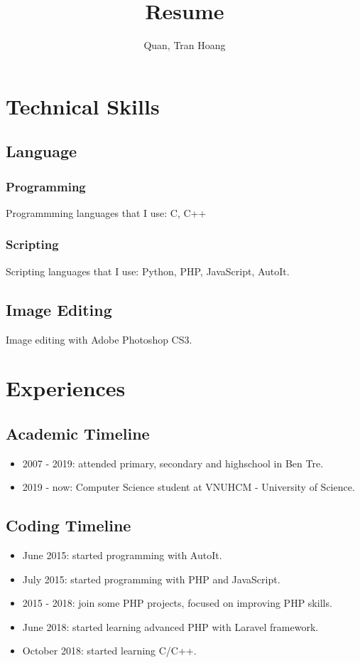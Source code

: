 \documentclass{article}
\begin{document}
    \title{Resume}
    \author{Quan, Tran Hoang}
    \maketitle

    \section{Technical Skills}

        \subsection{Language}
            \subsubsection{Programming}
                Programmming languages that I use: C, C++
            \subsubsection{Scripting}
                Scripting languages that I use: Python, PHP, JavaScript, AutoIt.

        \subsection{Image Editing}
            Image editing with Adobe Photoshop CS3.

    \section{Experiences}
        \subsection{Academic Timeline}
            \begin{itemize}
                \item 2007 - 2019: attended primary, secondary and highschool in Ben Tre.
                \item 2019 - now: Computer Science student at VNUHCM - University of Science.
            \end{itemize}

        \subsection{Coding Timeline}
            \begin{itemize}
                \item June 2015: started programming with AutoIt.
                \item July 2015: started programming with PHP and JavaScript.
                \item 2015 - 2018: join some PHP projects, focused on improving PHP skills.
                \item June 2018: started learning advanced PHP with Laravel framework.
                \item October 2018: started learning C/C++.
            \end{itemize}
\end{document}
